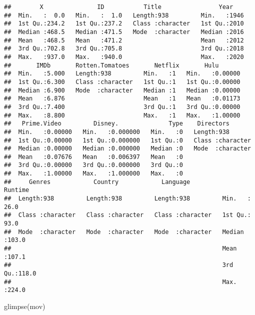 \documentclass[
]{article}
\newenvironment{Shaded}{\begin{snugshade}}{\end{snugshade}}
\newcommand{\FunctionTok}[1]{\textcolor[rgb]{0.00,0.00,0.00}{#1}}
\newcommand{\NormalTok}[1]{#1}
\begin{document}
\begin{verbatim}
##        X               ID           Title                Year     
##  Min.   :  0.0   Min.   :  1.0   Length:938         Min.   :1946  
##  1st Qu.:234.2   1st Qu.:237.2   Class :character   1st Qu.:2010  
##  Median :468.5   Median :471.5   Mode  :character   Median :2016  
##  Mean   :468.5   Mean   :471.2                      Mean   :2012  
##  3rd Qu.:702.8   3rd Qu.:705.8                      3rd Qu.:2018  
##  Max.   :937.0   Max.   :940.0                      Max.   :2020  
##       IMDb       Rotten.Tomatoes       Netflix       Hulu        
##  Min.   :5.000   Length:938         Min.   :1   Min.   :0.00000  
##  1st Qu.:6.300   Class :character   1st Qu.:1   1st Qu.:0.00000  
##  Median :6.900   Mode  :character   Median :1   Median :0.00000  
##  Mean   :6.876                      Mean   :1   Mean   :0.01173  
##  3rd Qu.:7.400                      3rd Qu.:1   3rd Qu.:0.00000  
##  Max.   :8.800                      Max.   :1   Max.   :1.00000  
##   Prime.Video         Disney.              Type    Directors        
##  Min.   :0.00000   Min.   :0.000000   Min.   :0   Length:938        
##  1st Qu.:0.00000   1st Qu.:0.000000   1st Qu.:0   Class :character  
##  Median :0.00000   Median :0.000000   Median :0   Mode  :character  
##  Mean   :0.07676   Mean   :0.006397   Mean   :0                     
##  3rd Qu.:0.00000   3rd Qu.:0.000000   3rd Qu.:0                     
##  Max.   :1.00000   Max.   :1.000000   Max.   :0                     
##     Genres            Country            Language            Runtime     
##  Length:938         Length:938         Length:938         Min.   : 26.0  
##  Class :character   Class :character   Class :character   1st Qu.: 93.0  
##  Mode  :character   Mode  :character   Mode  :character   Median :103.0  
##                                                           Mean   :107.1  
##                                                           3rd Qu.:118.0  
##                                                           Max.   :224.0
\end{verbatim}

\begin{Shaded}
\begin{Highlighting}[]
\FunctionTok{glimpse}\NormalTok{(mov)}
\end{Highlighting}
\end{Shaded}
\end{document}
